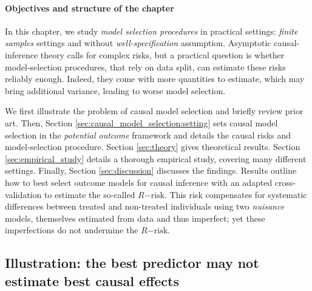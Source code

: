 \documentclass{report}
\begin{document}
\paragraph{Objectives and structure of the chapter}

In this chapter, we study \textit{model selection procedures}
in practical settings: \textit{finite samples} settings and without
\textit{well-specification} assumption. Asymptotic causal-inference
theory calls for complex risks, but a practical question is
whether model-selection procedures, that rely on data split, can estimate
these risks reliably enough. Indeed, they
come with more quantities to estimate, which may
bring additional variance, leading to worse model selection.

We first illustrate the problem of causal model
selection and briefly review prior art. Then, Section
\ref{sec:causal_model_selection:setting} sets causal model selection in the
\emph{potential outcome} framework and details the causal risks and
model-selection procedure. Section \ref{sec:theory} gives theoretical
results. Section \ref{sec:empirical_study} details a thorough empirical
study, covering many different settings. Finally, Section \ref{sec:discussion}
discusses the findings.
%
Results outline how to best select outcome models for causal
inference with an adapted
cross-validation to estimate the so-called $R\mathrm{-risk}$.
This risk compensates for systematic
differences between treated and non-treated individuals using
two \emph{nuisance} models,
themselves estimated from data and thus imperfect; yet these
imperfections do not undermine the $R\mathrm{-risk}$.


\subsection{Illustration: the best predictor may not estimate best causal
  effects}%
\label{subsec:causal_model_selection:illustration}%
\end{document}
